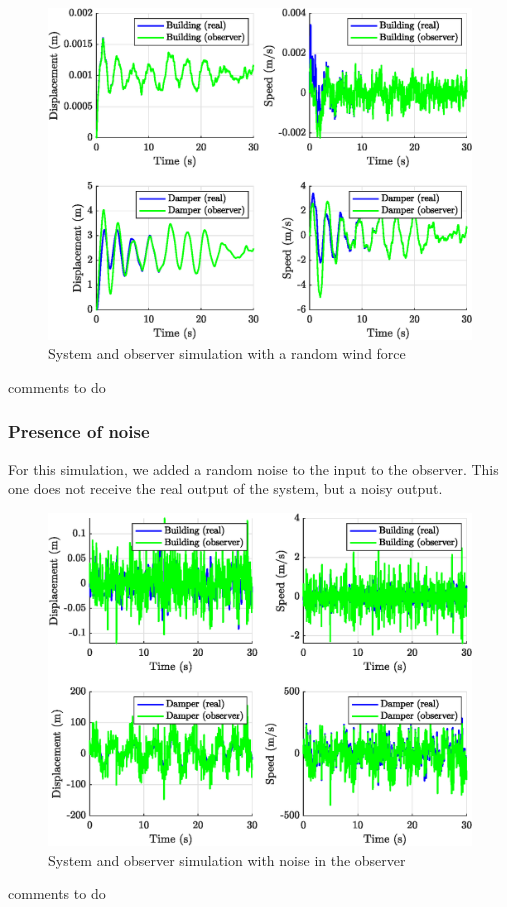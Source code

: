 \begin{figure}[H]
    \centering
    \includegraphics[width=\textwidth]{resources/eps/observer-random.eps}
    \caption{System and observer simulation with a random wind force}
\end{figure}
comments to do

\subsubsection{Presence of noise}
For this simulation, we added a random noise to the input to the observer. This one does not receive the real output of the system, but a noisy output.
\begin{figure}[H]
    \centering
    \includegraphics[width=\textwidth]{resources/eps/observer-noise.eps}
    \caption{System and observer simulation with noise in the observer}
\end{figure}
comments to do
